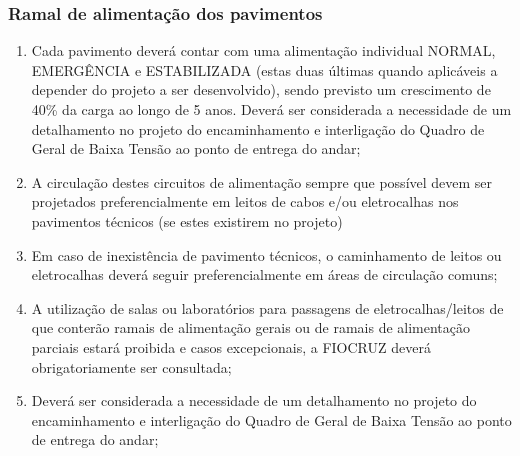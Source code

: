 \subsubsection{Ramal de alimentação dos pavimentos}

\begin{enumerate}
	\item Cada pavimento deverá contar com uma alimentação individual NORMAL, EMERGÊNCIA e ESTABILIZADA (estas duas últimas quando aplicáveis a depender do projeto a ser desenvolvido), sendo previsto um crescimento de 40\% da carga ao longo de 5 anos. Deverá ser considerada a necessidade de um detalhamento no projeto do encaminhamento e interligação do Quadro de Geral de Baixa Tensão ao ponto de entrega do andar;
	
	\item A circulação destes circuitos de alimentação sempre que possível devem ser projetados preferencialmente em leitos de cabos e/ou eletrocalhas nos pavimentos técnicos (se estes existirem no projeto)
	
	\item Em caso de inexistência de pavimento técnicos, o caminhamento de leitos ou eletrocalhas deverá seguir preferencialmente em áreas de circulação comuns;
	
	\item A utilização de salas ou laboratórios para passagens de eletrocalhas/leitos de que conterão ramais de alimentação gerais ou de ramais de alimentação parciais estará proibida e casos excepcionais, a FIOCRUZ deverá obrigatoriamente ser consultada;
	
	\item Deverá ser considerada a necessidade de um detalhamento no projeto do encaminhamento e interligação do Quadro de Geral de Baixa Tensão ao ponto de entrega do andar;

\end{enumerate}